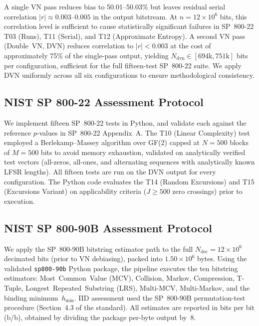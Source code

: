 \documentclass[conference]{IEEEtran}
\newcommand{\hmin}{\ensuremath{h_{\min}}}
\begin{document}
A single VN pass reduces bias to 50.01--50.03\% but leaves residual
serial correlation $|r|\!\approx\!0.003$--$0.005$ in the output
bitstream. At $n=12\!\times\!10^{6}$ bits, this correlation level is
sufficient to cause statistically significant failures in SP~800-22
T03 (Runs), T11 (Serial), and T12 (Approximate Entropy). A second VN
pass (Double~VN, DVN) reduces correlation to $|r|<0.003$ at the cost
of approximately 75\% of the single-pass output, yielding
$N_{\text{dvn}}\!\in\![694\mathrm{k}, 751\mathrm{k}]$ bits per
configuration, sufficient for the full fifteen-test SP~800-22 suite.
We apply DVN uniformly across all six configurations to ensure
methodological consistency.

\subsection{NIST SP 800-22 Assessment Protocol}

We implement fifteen SP~800-22 tests in Python,
and validate each against the reference $p$-values in SP~800-22
Appendix~A. The T10 (Linear Complexity) test employed a Berlekamp--Massey
algorithm over GF(2) capped at $N=500$ blocks of $M=500$ bits to avoid
memory exhaustion, validated on analytically verified test vectors
(all-zeros, all-ones, and alternating sequences with analytically
known LFSR lengths). All fifteen tests are run on the DVN output for
every configuration. The Python code evaluates the T14 (Random Excursions) and T15 (Excursions
Variant) on applicability criteria
($J\geq 500$ zero crossings) prior to execution.

\subsection{NIST SP 800-90B Assessment Protocol}

We apply the SP~800-90B bitstring estimator path to the full
$N_{\text{dec}}=12\!\times\!10^{6}$ decimated bits (prior to VN
debiasing), packed into $1.50\!\times\!10^{6}$ bytes. Using the validated 
\texttt{sp800-90b} Python package, the pipeline executes the ten bitstring
estimators:
Most~Common~Value (MCV), Collision, Markov, Compression, T-Tuple,
Longest~Repeated~Substring (LRS), Multi-MCV, Multi-Markov, and the
binding minimum~$\hmin$. IID assessment used the SP~800-90B
permutation-test procedure (Section~4.3 of the standard). All
estimates are reported in bits per bit (b/b), obtained by dividing
the package per-byte output by~8.

\end{document}
